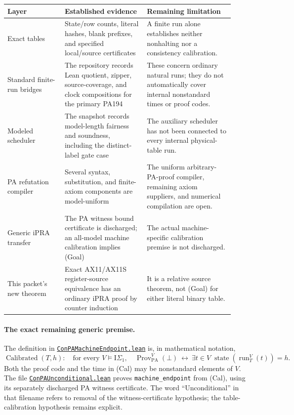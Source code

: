 \begin{center}
\small
\begin{tabular}{p{0.23\linewidth}p{0.33\linewidth}p{0.35\linewidth}}
\toprule
Layer & Established evidence & Remaining limitation\\
\midrule
Exact tables & State/row counts, literal hashes, blank prefixes, and
specified local/source certificates & A finite run alone establishes
neither nonhalting nor a consistency calibration.\\[4pt]
Standard finite-run bridges & The repository records Lean quotient,
zipper, source-coverage, and clock compositions for the primary PA194 &
These concern ordinary natural runs; they do not automatically cover
internal nonstandard times or proof codes.\\[4pt]
Modeled scheduler & The snapshot records model-length fairness and
soundness, including the distinct-label gate case & The auxiliary
scheduler has not been connected to every internal physical-table run.\\[4pt]
PA refutation compiler & Several syntax, substitution, and finite-axiom
components are model-uniform & The uniform arbitrary-PA-proof compiler,
remaining axiom suppliers, and numerical compilation are open.\\[4pt]
Generic iPRA transfer & The PA witness bound certificate is discharged;
an all-model machine calibration implies (Goal) & The actual
machine-specific calibration premise is not discharged.\\[4pt]
This packet's new theorem & Exact AX11/AX11S register-source equivalence
has an ordinary iPRA proof by counter induction & It is a relative source
theorem, not (Goal) for either literal binary table.\\
\bottomrule
\end{tabular}
\end{center}

\paragraph{The exact remaining generic premise.}
The definition in
\href{https://github.com/VladimirReshetnikov/ProveIt/blob/1c9524d8bf2e0a27b9a16ff622359927f536e663/Computability/BusyBeaver/Research/PA/isigma1-machine/ConPAMachineEndpoint.lean}{\texttt{ConPAMachineEndpoint.lean}}
is, in mathematical notation,
\[
 \operatorname{Calibrated}(T,h):\quad
 \text{for every }V\models\mathrm{I}\Sigma_1,\quad
 \operatorname{Prov}_{\mathrm{PA}}^V(\bot)
 \ \longleftrightarrow\
 \exists t\in V\;\operatorname{state}
                    (\operatorname{run}_T^V(t))=h.             \tag{Cal}
\]
Both the proof code and the time in (Cal) may be nonstandard elements of
$V$. The file
\href{https://github.com/VladimirReshetnikov/ProveIt/blob/1c9524d8bf2e0a27b9a16ff622359927f536e663/Computability/BusyBeaver/Research/PA/isigma1-machine/ConPAUnconditional.lean}{\texttt{ConPAUnconditional.lean}}
proves \texttt{machine\_endpoint} from (Cal), using its separately
discharged PA witness certificate. The word ``Unconditional'' in that
filename refers to removal of the witness-certificate hypothesis; the
table-calibration hypothesis remains explicit.

